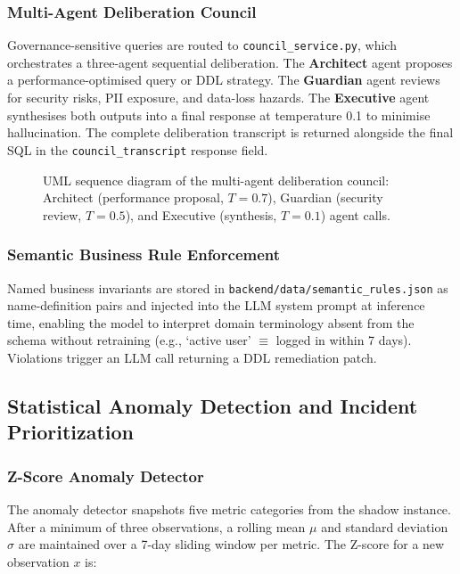\documentclass[12pt,a4paper]{report}
\begin{document}
\subsubsection{Multi-Agent Deliberation Council}

Governance-sensitive queries are routed to \texttt{council\_service.py}, which orchestrates a three-agent sequential deliberation. The \textbf{Architect} agent proposes a performance-optimised query or DDL strategy. The \textbf{Guardian} agent reviews for security risks, PII exposure, and data-loss hazards. The \textbf{Executive} agent synthesises both outputs into a final response at temperature 0.1 to minimise hallucination. The complete deliberation transcript is returned alongside the final SQL in the \texttt{council\_transcript} response field.

\begin{figure}[htbp]
    \centering
    \fbox{\rule{0pt}{5cm}\rule{\textwidth}{0pt}}
    \caption{UML sequence diagram of the multi-agent deliberation council: Architect (performance proposal, $T{=}0.7$), Guardian (security review, $T{=}0.5$), and Executive (synthesis, $T{=}0.1$) agent calls.}
    \label{fig:council}
\end{figure}

\subsubsection{Semantic Business Rule Enforcement}

Named business invariants are stored in \texttt{backend/data/semantic\_rules.json} as name-definition pairs and injected into the LLM system prompt at inference time, enabling the model to interpret domain terminology absent from the schema without retraining (e.g., `active user' $\equiv$ logged in within 7 days). Violations trigger an LLM call returning a DDL remediation patch.

\subsection{Statistical Anomaly Detection and Incident Prioritization}

\subsubsection{Z-Score Anomaly Detector}

The anomaly detector snapshots five metric categories from the shadow instance. After a minimum of three observations, a rolling mean $\mu$ and standard deviation $\sigma$ are maintained over a 7-day sliding window per metric. The Z-score for a new observation $x$ is:
\end{document}
